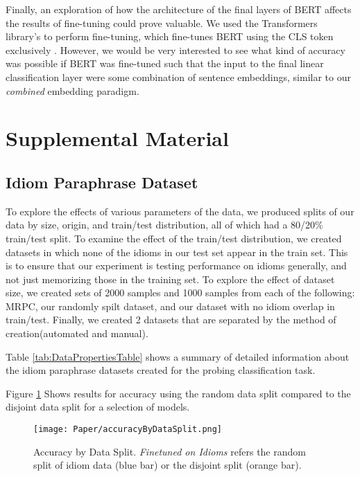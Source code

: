 \documentclass[11pt,a4paper]{article}
\begin{document}
Finally, an exploration of how the architecture of the final layers of BERT affects the results of fine-tuning could prove valuable. We used the Transformers library's to perform fine-tuning, which fine-tunes BERT using the CLS token exclusively \citep{Wolf2019HuggingFacesTS}. However, we would be very interested to see what kind of accuracy was possible if BERT was fine-tuned such that the input to the final linear classification layer were some combination of sentence embeddings, similar to our \textit{combined} embedding paradigm. 





\newpage\phantom{blabla}
\newpage

\appendix \section{Supplemental Material}

\subsection{Idiom Paraphrase Dataset}\label{section:dataset}

To explore the effects of various parameters of the data, we produced splits of our data by size, origin, and train/test distribution, all of which had a 80/20\% train/test split. To examine the effect of the train/test distribution, we created datasets in which none of the idioms in our test set appear in the train set. This is to ensure that our experiment is testing performance on idioms generally, and not just memorizing those in the training set. To explore the effect of dataset size, we created sets of 2000 samples and 1000 samples from each of the following: MRPC, our randomly spilt dataset, and our dataset with no idiom overlap in train/test.
Finally, we created 2 datasets that are separated by the method of creation(automated and manual). 

Table \ref{tab:DataPropertiesTable} shows a summary of detailed information about the idiom paraphrase datasets created for the probing classification task.

Figure \ref{fig:accuracyByDataSplit} Shows results for accuracy using the random data split compared to the disjoint data split for a selection of models.

\begin{figure}[h]
    \texttt{[image: Paper/accuracyByDataSplit.png]}
    \centering
        \caption{Accuracy by Data Split. \textit{Finetuned on Idioms} refers the random split of idiom data (blue bar) or the disjoint split (orange bar).}
    \label{fig:accuracyByDataSplit}
\end{figure} 
\end{document}
